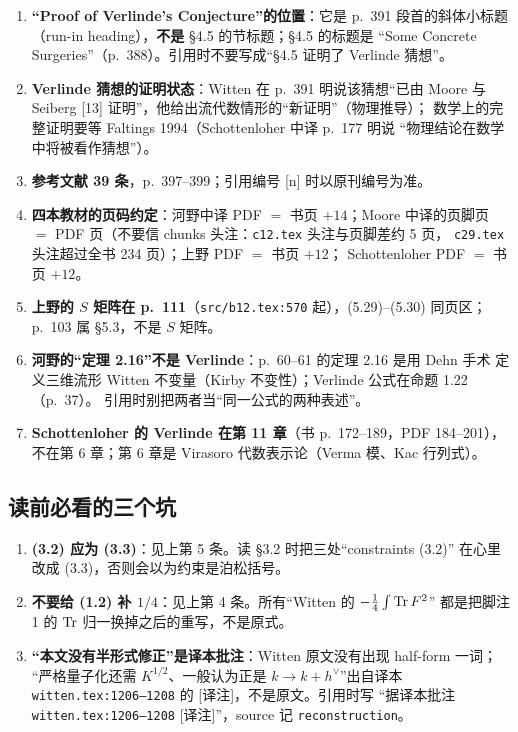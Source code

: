 \begin{enumerate}[leftmargin=1.8em,itemsep=2pt]
      此错误只在 §3.2，不波及 §1（§1 全文不引 §3 的公式）。
\item \textbf{“Proof of Verlinde's Conjecture”的位置}：它是 p.~391 段首的斜体小标题
      （run-in heading），\textbf{不是} §4.5 的节标题；§4.5 的标题是
      “Some Concrete Surgeries”（p.~388）。引用时不要写成“§4.5 证明了 Verlinde 猜想”。
\item \textbf{Verlinde 猜想的证明状态}：Witten 在 p.~391 明说该猜想“已由 Moore 与
      Seiberg [13] 证明”，他给出流代数情形的“新证明”（物理推导）；
      数学上的完整证明要等 Faltings 1994（Schottenloher 中译 p.~177 明说
      “物理结论在数学中将被看作猜想”）。
\item \textbf{参考文献 39 条}，p.~397--399；引用编号 [n] 时以原刊编号为准。
\item \textbf{四本教材的页码约定}：河野中译 PDF $=$ 书页 $+14$；Moore 中译的页脚页
      $=$ PDF 页（不要信 chunks 头注：\texttt{c12.tex} 头注与页脚差约 5 页，
      \texttt{c29.tex} 头注超过全书 234 页）；上野 PDF $=$ 书页 $+12$；
      Schottenloher PDF $=$ 书页 $+12$。
\item \textbf{上野的 $S$ 矩阵在 p.~111}（\texttt{src/b12.tex:570} 起），(5.29)--(5.30)
      同页区；p.~103 属 §5.3，不是 $S$ 矩阵。
\item \textbf{河野的“定理 2.16”不是 Verlinde}：p.~60--61 的定理 2.16 是用 Dehn 手术
      定义三维流形 Witten 不变量（Kirby 不变性）；Verlinde 公式在命题 1.22（p.~37）。
      引用时别把两者当“同一公式的两种表述”。
\item \textbf{Schottenloher 的 Verlinde 在第 11 章}（书 p.~172--189，PDF 184--201），
      不在第 6 章；第 6 章是 Virasoro 代数表示论（Verma 模、Kac 行列式）。
\end{enumerate}

\subsection{读前必看的三个坑}

\begin{enumerate}[leftmargin=1.8em,itemsep=2pt]
\item \textbf{(3.2) 应为 (3.3)}：见上第 5 条。读 §3.2 时把三处“constraints (3.2)”
      在心里改成 (3.3)，否则会以为约束是泊松括号。
\item \textbf{不要给 (1.2) 补 $1/4$}：见上第 4 条。所有“Witten 的 $-\frac14\int\operatorname{Tr} F^2$”
      都是把脚注 1 的 $\operatorname{Tr}$ 归一换掉之后的重写，不是原式。
\item \textbf{“本文没有半形式修正”是译本批注}：Witten 原文没有出现 half-form 一词；
      “严格量子化还需 $K^{1/2}$、一般认为正是 $k\to k+h^\vee$”出自译本
      \texttt{witten.tex:1206--1208} 的 [译注]，不是原文。引用时写
      “据译本批注 \texttt{witten.tex:1206--1208} [译注]”，source 记
      \texttt{reconstruction}。
\end{enumerate}

